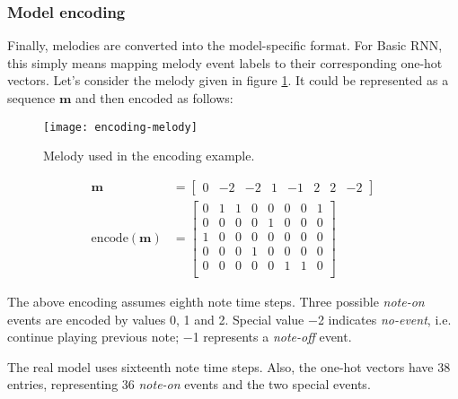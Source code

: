 \documentclass[../../report.tex]{subfiles}
\begin{document}
\subsubsection{Model encoding}

Finally, melodies are converted into the model-specific format. For Basic RNN,
this simply means mapping melody event labels to their corresponding one-hot
vectors. Let's consider the melody given in figure \ref{fig:encoding-melody}. It
could be represented as a sequence \(\bm{m}\) and then encoded as follows:

\begin{figure}[h]
  \centering
  \texttt{[image: encoding-melody]}
  \caption{Melody used in the encoding example.}
  \label{fig:encoding-melody}
\end{figure}

\begin{align*}
  \bm{m} &=
  \begin{bmatrix}
    0 & -2 & -2 & 1 & -1 & 2 & 2 & -2
  \end{bmatrix}
  \\
  \mathrm{encode}(\bm{m}) &=
  \begin{bmatrix}
    0 & 1 & 1 & 0 & 0 & 0 & 0 & 1 \\
    0 & 0 & 0 & 0 & 1 & 0 & 0 & 0 \\
    1 & 0 & 0 & 0 & 0 & 0 & 0 & 0 \\
    0 & 0 & 0 & 1 & 0 & 0 & 0 & 0 \\
    0 & 0 & 0 & 0 & 0 & 1 & 1 & 0 \\
  \end{bmatrix}
\end{align*}

The above encoding assumes eighth note time steps. Three possible \emph{note-on}
events are encoded by values 0, 1 and 2. Special value \num{-2} indicates
\emph{no-event}, i.e. continue playing previous note; \num{-1} represents a
\emph{note-off} event.

The real model uses sixteenth note time steps. Also, the one-hot vectors have 38
entries, representing 36 \emph{note-on} events and the two special events.
\end{document}
